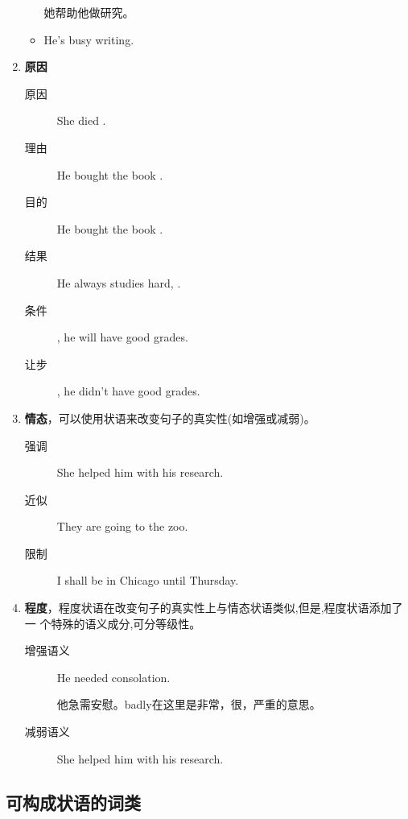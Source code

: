 \begin{enumerate}
\begin{itemize}
    她帮助他做研究。
  \item He's busy writing.
  \end{itemize}
\item \textbf{原因}
  \begin{description}
  \item[原因] She died .
  \item[理由] He bought the book .
  \item[目的] He bought the book .
  \item[结果] He always studies hard, .
  \item[条件] , he will have good grades.
  \item[让步] , he didn't have good grades.
  \end{description}

\item \textbf{情态}，可以使用状语来改变句子的真实性(如增强或减弱)。
  \begin{description}
  \item[强调] She  helped him with his research.

  \item[近似] They are  going to the zoo.

  \item[限制] I shall be in Chicago  until Thursday.
  \end{description}

\item \textbf{程度}，程度状语在改变句子的真实性上与情态状语类似,但是,程度状语添加了一
  个特殊的语义成分,可分等级性。
  \begin{description}
  \item[增强语义] He  needed consolation.

    他急需安慰。badly在这里是非常，很，严重的意思。

  \item[减弱语义] She helped him  with his research.
  \end{description}
\end{enumerate}

\subsection{可构成状语的词类}

